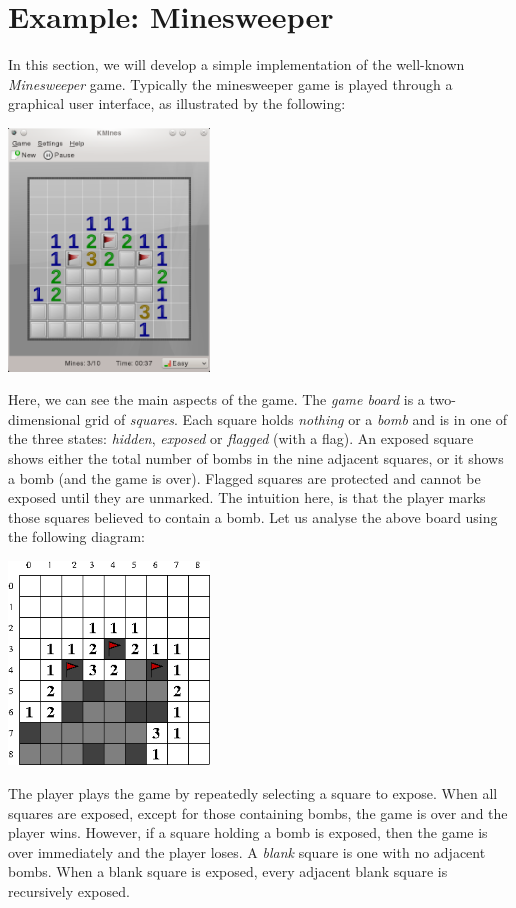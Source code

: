\newpage
\section{Example: Minesweeper}
In this section, we will develop a simple implementation of the well-known {\em Minesweeper} game.  Typically the minesweeper game is played through a graphical user interface, as illustrated by the following:
\begin{center}
\includegraphics[width=0.4\textwidth]{../images/kmines.png}
\end{center}
Here, we can see the main aspects of the game.  The {\em game board} is a two-dimensional grid of {\em squares}.  Each square holds {\em nothing} or a {\em bomb} and is in one of the three states: {\em hidden}, {\em exposed} or {\em flagged} (with a flag).  An exposed square shows either the total number of bombs in the nine adjacent squares, or it shows a bomb (and the game is over).  Flagged squares are protected and cannot be exposed until they are unmarked.  The intuition here, is that the player marks those squares believed to contain a bomb.  Let us analyse the above board using the following diagram:

\begin{center}
\includegraphics[width=0.4\textwidth]{../images/kmines_analysis.png}
\end{center}


The player plays the game by repeatedly selecting a square to expose.  When all squares are exposed, except for those containing bombs, the game is over and the player wins.  However, if a square holding a bomb is exposed, then the game is over immediately and the player loses.  A {\em blank} square is one with no adjacent bombs.  When a blank square is exposed, every adjacent blank square is recursively exposed.

